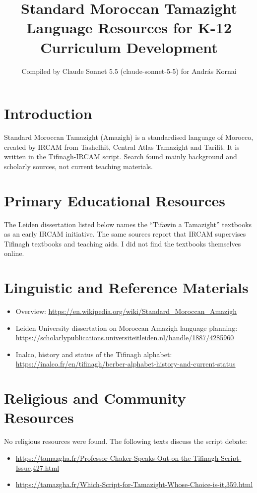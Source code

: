 \documentclass[12pt]{article}
\title{Standard Moroccan Tamazight Language Resources for K-12 Curriculum Development}
\author{Compiled by Claude Sonnet 5.5 (claude-sonnet-5-5) for Andr\'as Kornai}
\date{}
\begin{document}
\maketitle

\section{Introduction}
Standard Moroccan Tamazight (Amazigh) is a standardised language of Morocco, created by IRCAM from Tashelhit, Central Atlas Tamazight and Tarifit. It is written in the Tifinagh-IRCAM script. Search found mainly background and scholarly sources, not current teaching materials.

\section{Primary Educational Resources}
The Leiden dissertation listed below names the ``Tifawin a Tamazight'' textbooks as an early IRCAM initiative. The same sources report that IRCAM supervises Tifinagh textbooks and teaching aids. I did not find the textbooks themselves online.

\section{Linguistic and Reference Materials}
\begin{itemize}
\item Overview: \url{https://en.wikipedia.org/wiki/Standard_Moroccan_Amazigh}
\item Leiden University dissertation on Moroccan Amazigh language planning: \url{https://scholarlypublications.universiteitleiden.nl/handle/1887/4285960}
\item Inalco, history and status of the Tifinagh alphabet: \url{https://inalco.fr/en/tifinagh/berber-alphabet-history-and-current-status}
\end{itemize}

\section{Religious and Community Resources}
No religious resources were found. The following texts discuss the script debate:
\begin{itemize}
\item \url{https://tamazgha.fr/Professor-Chaker-Speaks-Out-on-the-Tifinagh-Script-Issue,427.html}
\item \url{https://tamazgha.fr/Which-Script-for-Tamazight-Whose-Choice-is-it,359.html}
\end{itemize}
\end{document}
